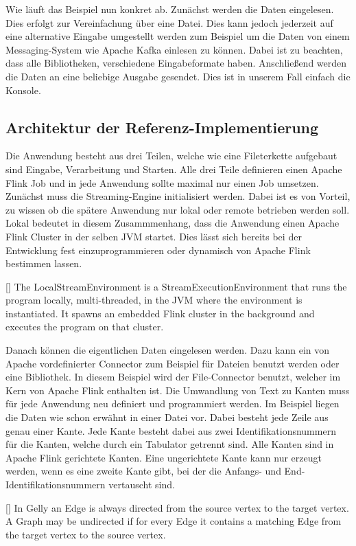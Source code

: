 Wie läuft das Beispiel nun konkret ab. Zunächst werden die Daten eingelesen. Dies
erfolgt zur Vereinfachung über eine Datei. Dies kann jedoch jederzeit auf eine
alternative Eingabe umgestellt werden zum Beispiel um die Daten von einem
Messaging-System wie Apache Kafka einlesen zu können. Dabei ist zu beachten,
dass alle Bibliotheken, verschiedene Eingabeformate haben. Anschließend werden
die Daten an eine beliebige Ausgabe gesendet. Dies ist in unserem Fall einfach
die Konsole.

\subsection{Architektur der Referenz-Implementierung}
Die Anwendung besteht aus drei Teilen, welche wie eine Fileterkette aufgebaut
sind Eingabe, Verarbeitung und Starten. Alle drei Teile definieren einen Apache
Flink Job und in jede Anwendung sollte maximal nur einen Job umsetzen. Zunächst
muss die Streaming-Engine initialisiert werden. Dabei ist es von Vorteil, zu
wissen ob die spätere Anwendung nur lokal oder remote betrieben werden soll.
Lokal bedeutet in diesem Zusammmenhang, dass die Anwendung einen Apache Flink
Cluster in der selben JVM startet. Dies lässt sich bereits bei der Entwicklung
fest einzuprogrammieren oder dynamisch von Apache Flink bestimmen lassen.

[\cite{Foundation2018}]{
The LocalStreamEnvironment is a StreamExecutionEnvironment that runs the program
locally, multi-threaded, in the JVM where the environment is instantiated. It
spawns an embedded Flink cluster in the background and executes the program on
that cluster.}

Danach können die eigentlichen Daten eingelesen werden. Dazu kann ein von Apache
vordefinierter Connector zum Beispiel für Dateien benutzt werden oder eine
Bibliothek. In diesem Beispiel wird der File-Connector benutzt, welcher im Kern
von Apache Flink enthalten ist. Die Umwandlung von Text zu Kanten muss für jede
Anwendung neu definiert und programmiert werden. Im Beispiel liegen die Daten
wie schon erwähnt in einer Datei vor. Dabei besteht jede Zeile aus genau einer
Kante. Jede Kante besteht dabei aus zwei Identifikationsnummern für die Kanten,
welche durch ein Tabulator getrennt sind. Alle Kanten sind in Apache Flink
gerichtete Kanten. Eine ungerichtete Kante kann nur erzeugt werden, wenn es eine
zweite Kante gibt, bei der die Anfangs- und End-Identifikationsnummern vertauscht
sind.

[\cite{Foundation2018}]{
In Gelly an Edge is always directed from the source vertex to the target vertex.
A Graph may be undirected if for every Edge it contains a matching Edge from the
target vertex to the source vertex.}

